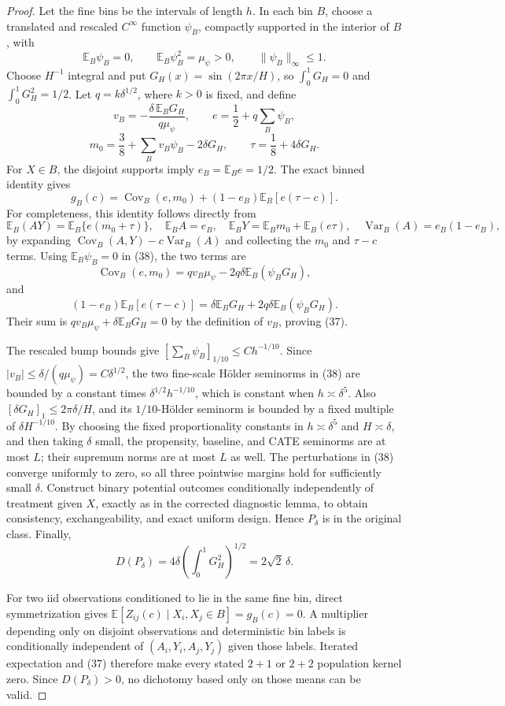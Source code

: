 \documentclass{article}
\begin{document}
\begin{proof}
Let the fine bins be the intervals of length \(h\).  In each bin \(B\), choose a translated and rescaled \(C^\infty\) function \(\psi_B\), compactly supported in the interior of \(B\), with
\[
 \mathbb E_B\psi_B=0,
 \qquad \mathbb E_B\psi_B^2=\mu_\psi>0,
 \qquad \|\psi_B\|_\infty\leq1.
\]
Choose \(H^{-1}\) integral and put \(G_H(x)=\sin(2\pi x/H)\), so \(\int_0^1G_H=0\) and \(\int_0^1G_H^2=1/2\).  Let \(q=k\delta^{1/2}\), where \(k>0\) is fixed, and define
\[
 v_B=-\frac{\delta\,\mathbb E_B G_H}{q\mu_\psi},
 \qquad
 e=\frac12+q\sum_B\psi_B,
\]
\[
 m_0=\frac38+\sum_Bv_B\psi_B-2\delta G_H,
 \qquad
 \tau=\frac18+4\delta G_H.
 \tag{38}
\]
For \(X\in B\), the disjoint supports imply \(e_B=\mathbb E_Be=1/2\).  The exact binned identity gives
\[
 g_B(c)=\operatorname{Cov}_B(e,m_0)+(1-e_B)\mathbb E_B[e(\tau-c)].
\]
For completeness, this identity follows directly from
\[
 \mathbb E_B(AY)=\mathbb E_B\{e(m_0+\tau)\},
 \quad
 \mathbb E_BA=e_B,
 \quad
 \mathbb E_BY=\mathbb E_Bm_0+\mathbb E_B(e\tau),
 \quad
 \operatorname{Var}_B(A)=e_B(1-e_B),
\]
by expanding \(\operatorname{Cov}_B(A,Y)-c\operatorname{Var}_B(A)\) and collecting the \(m_0\) and \(\tau-c\) terms.
Using \(\mathbb E_B\psi_B=0\) in (38), the two terms are
\[
 \operatorname{Cov}_B(e,m_0)
 =qv_B\mu_\psi-2q\delta\mathbb E_B(\psi_BG_H),
\]
and
\[
 (1-e_B)\mathbb E_B[e(\tau-c)]
 =\delta\mathbb E_BG_H+2q\delta\mathbb E_B(\psi_BG_H).
\]
Their sum is \(qv_B\mu_\psi+\delta\mathbb E_BG_H=0\) by the definition of \(v_B\), proving (37).

The rescaled bump bounds give \([\sum_B\psi_B]_{1/10}\leq C h^{-1/10}\).  Since \(|v_B|\leq\delta/(q\mu_\psi)=C\delta^{1/2}\), the two fine-scale Hölder seminorms in (38) are bounded by a constant times \(\delta^{1/2}h^{-1/10}\), which is constant when \(h\asymp\delta^5\).  Also \([\delta G_H]_1\leq2\pi\delta/H\), and its \(1/10\)-Hölder seminorm is bounded by a fixed multiple of \(\delta H^{-1/10}\).  By choosing the fixed proportionality constants in \(h\asymp\delta^5\) and \(H\asymp\delta\), and then taking \(\delta\) small, the propensity, baseline, and CATE seminorms are at most \(L\); their supremum norms are at most \(L\) as well.  The perturbations in (38) converge uniformly to zero, so all three pointwise margins hold for sufficiently small \(\delta\).  Construct binary potential outcomes conditionally independently of treatment given \(X\), exactly as in the corrected diagnostic lemma, to obtain consistency, exchangeability, and exact uniform design.  Hence \(P_\delta\) is in the original class.  Finally,
\[
 D(P_\delta)=4\delta\left(\int_0^1G_H^2\right)^{1/2}
 =2\sqrt2\,\delta.
\]

For two iid observations conditioned to lie in the same fine bin, direct symmetrization gives \(\mathbb E[Z_{ij}(c)\mid X_i,X_j\in B]=g_B(c)=0\).  A multiplier depending only on disjoint observations and deterministic bin labels is conditionally independent of \((A_i,Y_i,A_j,Y_j)\) given those labels.  Iterated expectation and (37) therefore make every stated \(2+1\) or \(2+2\) population kernel zero.  Since \(D(P_\delta)>0\), no dichotomy based only on those means can be valid.
\end{proof}
\end{document}

